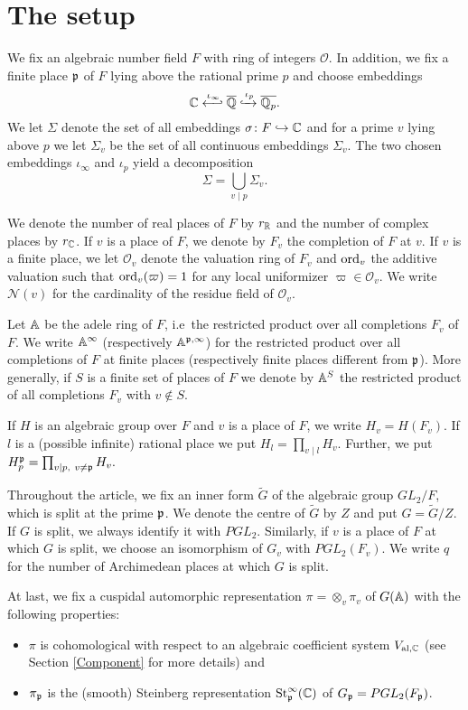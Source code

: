 \section{The setup}\label{Setup}
We fix an algebraic number field $F$ with ring of integers $\mathcal{O}$.
In addition, we fix a finite place $\mathfrak{p}$ of $F$ lying above the rational prime $p$ and choose embeddings
$$\C \xhookleftarrow{\iota_{\infty}} \overline{\Q} \xhookrightarrow{\iota_{p}} \overline{\Q_p}.$$
We let $\Sigma$ denote the set of all embeddings $\sigma\colon F\hookrightarrow \mathbb{C}$ and for a prime $v$ lying above $p$ we let $\Sigma_v$ be the set of all continuous embeddings $\Sigma_{v}$.
The two chosen embeddings $\iota_{\infty}$ and $\iota_{p}$ yield a decomposition
$$\Sigma=\bigcup_{v\mid p}\Sigma_v.$$

We denote the number of real places of $F$ by $r_{\mathbb{R}}$ and the number of complex places by $r_{\mathbb{C}}$.
If $v$ is a place of $F$, we denote by $F_{v}$ the completion of $F$ at $v$.
If $v$ is a finite place, we let $\mathcal{O}_{v}$ denote the valuation ring of $F_{v}$ and $\operatorname{ord}_{v}$ the additive valuation such that $\operatorname{ord}_{v}(\varpi)=1$ for any local uniformizer $\varpi\in\mathcal{O}_{v}$.
We write $\mathcal{N}(v)$ for the cardinality of the residue field of $\mathcal{O}_{v}$.

Let $\mathbb{A}$ be the adele ring of $F$, i.e~the restricted product over all completions $F_{v}$ of $F$.
We write $\mathbb{A}^\infty$ (respectively $\mathbb{A}^{\mathfrak{p},\infty}$) for the restricted product over all completions of $F$ at finite places (respectively finite places different from $\mathfrak{p}$).
More generally, if $S$ is a finite set of places of $F$ we denote by $\mathbb{A}^{S}$ the restricted product of all completions $F_v$ with $v\notin S$.

If $H$ is an algebraic group over $F$ and $v$ is a place of $F$, we write $H_v=H(F_v)$.
If $l$ is a (possible infinite) rational place we put $H_l=\prod_{v\mid l}H_v$.
Further, we put $H_p^{\p}=\prod_{v\mid p,\ v\neq \p}H_v.$

Throughout the article, we fix an inner form $\widetilde{G}$ of the algebraic group $GL_2/F$, which is split at the prime $\mathfrak{p}$.
We denote the centre of $\widetilde{G}$ by $Z$ and put $G=\widetilde{G}/Z$.
If $G$ is split, we always identify it with $PGL_2$.
Similarly, if $v$ is a place of $F$ at which $G$ is split, we choose an isomorphism of $G_v$ with $PGL_2(F_v)$.
We write $q$ for the number of Archimedean places at which $G$ is split.


At last, we fix a cuspidal automorphic representation $\pi=\otimes_v \pi_v$ of $G(\mathbb{A})$ with the following properties:
\begin{itemize}
\item $\pi$ is cohomological with respect to an algebraic coefficient system $V_{\operatorname{al},\mathbb{C}}$ (see Section \ref{Component} for more details)
 and
\item $\pi_{\mathfrak{p}}$ is the (smooth) Steinberg representation $\operatorname{St}^{\infty}_{\mathfrak{p}}(\mathbb{C})$ of $G_{\mathfrak{p}}=PGL_2(F_{\mathfrak{p}})$.
\end{itemize}

